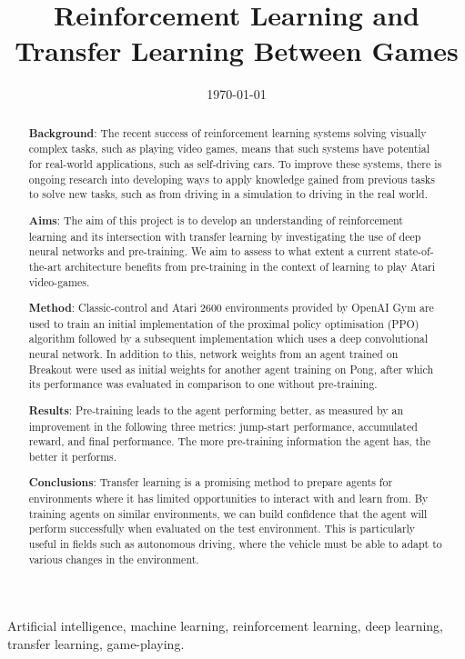 \documentclass[12pt,a4paper]{article}
\title{Reinforcement Learning and \\ Transfer Learning Between Games}
\author{} %
\date{\today}
\begin{document}
\maketitle

\begin{abstract}
{\bf Background}: The recent success of reinforcement learning systems solving visually complex tasks, such as playing video games, means that such systems have potential for real-world applications, such as self-driving cars. To improve these systems, there is ongoing research into developing ways to apply knowledge gained from previous tasks to solve new tasks, such as from driving in a simulation to driving in the real world.

{\bf Aims}: The aim of this project is to develop an understanding of reinforcement learning and its intersection with transfer learning by investigating the use of deep neural networks and pre-training. We aim to assess to what extent a current state-of-the-art architecture benefits from pre-training in the context of learning to play Atari video-games.

{\bf Method}: Classic-control and Atari 2600 environments provided by OpenAI Gym are used to train an initial implementation of the proximal policy optimisation (PPO) algorithm followed by a subsequent implementation which uses a deep convolutional neural network. In addition to this, network weights from an agent trained on Breakout were used as initial weights for another agent training on Pong, after which its performance was evaluated in comparison to one without pre-training. 

{\bf Results}: Pre-training leads to the agent performing better, as measured by an improvement in the following three metrics: jump-start performance, accumulated reward, and final performance. The more pre-training information the agent has, the better it performs. 

{\bf Conclusions}: Transfer learning is a promising method to prepare agents for environments where it has limited opportunities to interact with and learn from. By training agents on similar environments, we can build confidence that the agent will perform successfully when evaluated on the test environment. This is particularly useful in fields such as autonomous driving, where the vehicle must be able to adapt to various changes in the environment.
\end{abstract}

\begin{keywords}
Artificial intelligence, machine learning, reinforcement learning, deep learning, transfer learning, game-playing.
\end{keywords}
\end{document}
